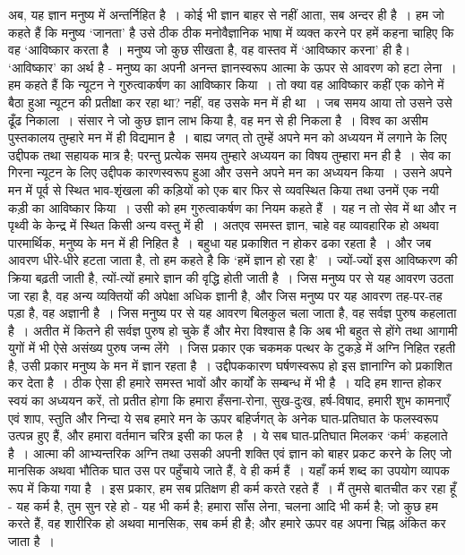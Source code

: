 अब, यह ज्ञान मनुष्य में अन्तर्निहित है~। कोई भी ज्ञान बाहर से नहीं आता, सब अन्दर ही है~। हम जो कहते हैं कि मनुष्य ‘जानता’ है उसे ठीक ठीक मनोवैज्ञानिक भाषा में व्यक्त करने पर हमें कहना चाहिए कि वह ‘आविष्कार करता है~। मनुष्य जो कुछ सीखता है, वह वास्तव में ‘आविष्कार करना’ ही है। ‘आविष्कार’ का अर्थ है - मनुष्य का अपनी अनन्त ज्ञानस्वरूप आत्मा के ऊपर से आवरण को हटा लेना~। हम कहते हैं कि न्यूटन ने गुरुत्वाकर्षण का आविष्कार किया~। तो क्या वह आविष्कार कहीं एक कोने में बैठा हुआ न्यूटन की प्रतीक्षा कर रहा था? नहीं, वह उसके मन में ही था~। जब समय आया तो उसने उसे ढूँढ निकाला~। संसार ने जो कुछ ज्ञान लाभ किया है, वह मन से ही निकला है~। विश्व का असीम पुस्तकालय तुम्हारे मन में ही विद्यमान है~। बाह्य जगत् तो तुम्हें अपने मन को अध्ययन में लगाने के लिए उद्दीपक तथा सहायक मात्र है; परन्तु प्रत्येक समय तुम्हारे अध्ययन का विषय तुम्हारा मन ही है~। सेव का गिरना न्यूटन के लिए उद्दीपक कारणस्वरूप हुआ और उसने अपने मन का अध्ययन किया~। उसने अपने मन में पूर्व से स्थित भाव-शृंखला की कड़ियों को एक बार फिर से व्यवस्थित किया तथा उनमें एक नयी कड़ी का आविष्कार किया~। उसी को हम गुरुत्वाकर्षण का नियम कहते हैं~। यह न तो सेव में था और न पृथ्वी के केन्द्र में स्थित किसी अन्य वस्तु में ही~। अतएव समस्त ज्ञान, चाहे वह व्यावहारिक हो अथवा पारमार्थिक, मनुष्य के मन में ही निहित है~। बहुधा यह प्रकाशित न होकर ढका रहता है~। और जब आवरण धीरे-धीरे हटता जाता है, तो हम कहते है कि ‘हमें ज्ञान हो रहा है’~। ज्यों-ज्यों इस आविष्करण की क्रिया बढ़ती जाती है, त्यों-त्यों हमारे ज्ञान की वृद्धि होती जाती है~। जिस मनुष्य पर से यह आवरण उठता जा रहा है, वह अन्य व्यक्तियों की अपेक्षा अधिक ज्ञानी है, और जिस मनुष्य पर यह आवरण तह-पर-तह पड़ा है, वह अज्ञानी है~। जिस मनुष्य पर से यह आवरण बिलकुल चला जाता है, वह सर्वज्ञ पुरुष कहलाता है~। अतीत में कितने ही सर्वज्ञ पुरुष हो चुके हैं और मेरा विश्वास है कि अब भी बहुत से होंगे तथा आगामी युगों में भी ऐसे असंख्य पुरुष जन्म लेंगे~। जिस प्रकार एक चकमक पत्थर के टुकड़े में अग्नि निहित रहती है, उसी प्रकार मनुष्य के मन में ज्ञान रहता है~। उद्दीपककारण घर्षणस्वरूप हो इस ज्ञानाग्नि को प्रकाशित कर देता है~। ठीक ऐसा ही हमारे समस्त भावों और कार्यों के सम्बन्ध में भी है~। यदि हम शान्त होकर स्वयं का अध्ययन करें, तो प्रतीत होगा कि हमारा हँसना-रोना, सुख-दुःख, हर्ष-विषाद, हमारी शुभ कामनाएँ एवं शाप, स्तुति और निन्दा ये सब हमारे मन के ऊपर बहिर्जगत् के अनेक घात-प्रतिघात के फलस्वरूप उत्पन्न हुए हैं, और हमारा वर्तमान चरित्र इसी का फल है~। ये सब घात-प्रतिघात मिलकर ‘कर्म’ कहलाते है~। आत्मा की आभ्यन्तरिक अग्नि तथा उसकी अपनी शक्ति एवं ज्ञान को बाहर प्रकट करने के लिए जो मानसिक अथवा भौतिक घात उस पर पहुँचाये जाते हैं, वे ही कर्म हैं~। यहाँ कर्म शब्द का उपयोग व्यापक रूप में किया गया है~। इस प्रकार, हम सब प्रतिक्षण ही कर्म करते रहते हैं~। मैं तुमसे बातचीत कर रहा हूँ - यह कर्म है, तुम सुन रहे हो - यह भी कर्म है; हमारा साँस लेना, चलना आदि भी कर्म है; जो कुछ हम करते हैं, वह शारीरिक हो अथवा मानसिक, सब कर्म ही है; और हमारे ऊपर वह अपना चिह्न अंकित कर जाता है~।

